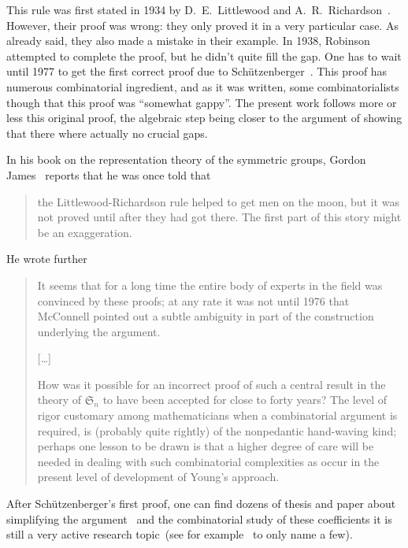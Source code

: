 \documentclass[12pt,a4paper]{article}
\newcommand{\SG}{{\mathfrak S}}
\begin{document}
This rule was first stated in 1934 by D.~E.~Littlewood and
A.~R.~Richardson~\cite{LR}. However, their proof was wrong: they only proved
it in a very particular case. As already said, they also made a mistake in
their example. In 1938, Robinson~\cite{Robinson} attempted to complete the
proof, but he didn't quite fill the gap. One has to wait until 1977 to get the
first correct proof due to Schützenberger~\cite{SchutzLR}. This proof has
numerous combinatorial ingredient, and as it was written, some
combinatorialists though that this proof was ``somewhat gappy''. The present
work follows more or less this original proof, the algebraic step being closer
to the argument of \cite{NCSF7} showing that there where actually no crucial
gaps.
\medskip

In his book on the representation theory of the symmetric groups, Gordon
James~\cite{James} reports that he was once told that
\begin{quotation}
  the Littlewood-Richardson rule helped to get men on the moon, but it was not
  proved until after they had got there. The first part of this story might be
  an exaggeration.
\end{quotation}
He wrote further
\begin{quotation}
  It seems that for a long time the entire body of experts in the field was
  convinced by these proofs; at any rate it was not until 1976 that McConnell
  pointed out a subtle ambiguity in part of the construction underlying the
  argument.

  [\dots]

  How was it possible for an incorrect proof of such a central result in the
  theory of $\SG_n$ to have been accepted for close to forty years? The level
  of rigor customary among mathematicians when a combinatorial argument is
  required, is (probably quite rightly) of the nonpedantic hand-waving kind;
  perhaps one lesson to be drawn is that a higher degree of care will be
  needed in dealing with such combinatorial complexities as occur in the
  present level of development of Young's approach.
\end{quotation}


After Schützenberger's first proof, one can find dozens of thesis and
paper about simplifying the argument~\cite{Zelevinsky81,Macdonald95,Gasharov98,DHT01,VanLeeuwen01,Stembridge02}
and the combinatorial study of these coefficients it is still a very active
research topic~(see for example~\cite{qAnalogs,KingToumazetTollu,KnutsonTao}
to only name a few).
\end{document}
